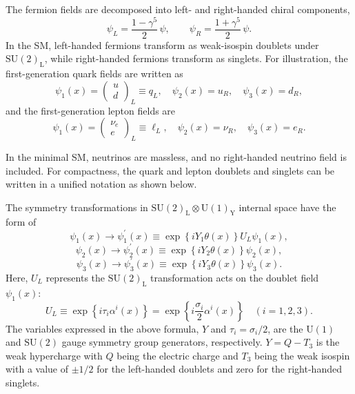 The fermion fields are decomposed into left- and right-handed chiral components,
\begin{equation}
\psi_{L} = \frac{1-\gamma^{5}}{2}\,\psi,
\qquad
\psi_{R} = \frac{1+\gamma^{5}}{2}\,\psi.
\end{equation}
In the SM, left-handed fermions transform as weak-isospin doublets under $\mathrm{SU}(2)_{\text{L}}$, while right-handed fermions transform as singlets.
%
For illustration, the first-generation quark fields are written as
\begin{equation}
\psi_{1}(x)=\left(\begin{array}{c}
u \\
d
\end{array}\right)_{L} \equiv q_{L}, \quad \psi_{2}(x)=u_{R}, \quad \psi_{3}(x)=d_{R} ,
\end{equation}
and the first-generation lepton fields are
\begin{equation}
\psi_{1}(x)=\left(\begin{array}{c}
\nu_{e} \\
e
\end{array}\right)_{L} \equiv \ell_{L}, \quad \psi_{2}(x)=\nu_{R}, \quad \psi_{3}(x)=e_{R}.
\end{equation}

In the minimal SM, neutrinos are massless, and no right-handed neutrino field is included. For compactness, the quark and lepton doublets and singlets can be written in a unified notation as shown below.


The symmetry transformations in $\mathrm{SU}(2)_{\text{L}} \otimes \mathrm{U}(1)_{\text{Y}}$ internal space have the form of
\begin{equation}
    \psi_{1}(x) {\longrightarrow} \psi_{1}^{\prime}(x) \equiv \exp \left\{i Y_{1} \theta(x)\right\} U_{L} \psi_{1}(x),
\end{equation}
\begin{equation}
    \psi_{2}(x) {\longrightarrow} \psi_{2}^{\prime}(x) \equiv \exp \left\{i Y_{2} \theta(x)\right\} \psi_{2}(x),
\end{equation}
\begin{equation}
    \psi_{3}(x) {\longrightarrow} \psi_{3}^{\prime}(x) \equiv \exp \left\{i Y_{3} \theta(x)\right\} \psi_{3}(x).
\end{equation}
Here, $U_L$ represents the $\text{SU}(2)_{\text{L}}$ transformation acts on the doublet field $\psi_1(x)$:
\begin{equation}
    U_{L} \equiv \exp{\left\{i\tau_i\alpha^i(x)\right\}}
    = \exp \left\{i \frac{\sigma_{i}}{2} \alpha^{i}(x) \right\} \quad(i=1,2,3).
\end{equation}
The variables expressed in the above formula, $Y$ and $\tau_{i}=\sigma_i/2$, are the $\text{U}(1)$ and $\text{SU}(2)$ gauge symmetry group generators, respectively. $Y=Q - T_3$ is the weak hypercharge with $Q$ being the electric charge and $T_3$ being the weak isospin with a value of $\pm1/2$ for the left-handed doublets and zero for the right-handed singlets. 


